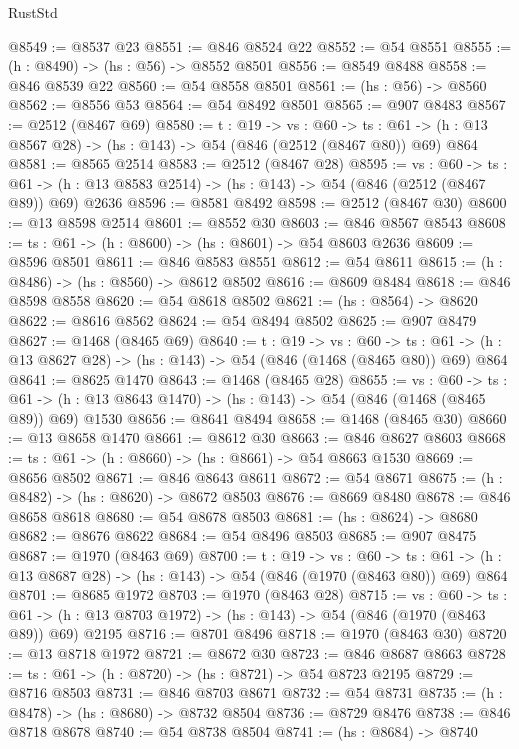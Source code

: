 \begin{lexlean}{RustStd}
\begin{coremodule}
@8549 := @8537 @23
@8551 := @846 @8524 @22
@8552 := @54 @8551
@8555 := (h : @8490) -> (hs : @56) -> @8552 @8501
@8556 := @8549 @8488
@8558 := @846 @8539 @22
@8560 := @54 @8558 @8501
@8561 := (hs : @56) -> @8560
@8562 := @8556 @53
@8564 := @54 @8492 @8501
@8565 := @907 @8483
@8567 := @2512 (@8467 @69)
@8580 := {t : @19} ->
  {vs : @60} ->
  {ts : @61} -> (h : @13 @8567 @28) -> (hs : @143) -> @54 (@846 (@2512 (@8467 @80)) @69) @864
@8581 := @8565 @2514
@8583 := @2512 (@8467 @28)
@8595 := {vs : @60} ->
  {ts : @61} -> (h : @13 @8583 @2514) -> (hs : @143) -> @54 (@846 (@2512 (@8467 @89)) @69) @2636
@8596 := @8581 @8492
@8598 := @2512 (@8467 @30)
@8600 := @13 @8598 @2514
@8601 := @8552 @30
@8603 := @846 @8567 @8543
@8608 := {ts : @61} -> (h : @8600) -> (hs : @8601) -> @54 @8603 @2636
@8609 := @8596 @8501
@8611 := @846 @8583 @8551
@8612 := @54 @8611
@8615 := (h : @8486) -> (hs : @8560) -> @8612 @8502
@8616 := @8609 @8484
@8618 := @846 @8598 @8558
@8620 := @54 @8618 @8502
@8621 := (hs : @8564) -> @8620
@8622 := @8616 @8562
@8624 := @54 @8494 @8502
@8625 := @907 @8479
@8627 := @1468 (@8465 @69)
@8640 := {t : @19} ->
  {vs : @60} ->
  {ts : @61} -> (h : @13 @8627 @28) -> (hs : @143) -> @54 (@846 (@1468 (@8465 @80)) @69) @864
@8641 := @8625 @1470
@8643 := @1468 (@8465 @28)
@8655 := {vs : @60} ->
  {ts : @61} -> (h : @13 @8643 @1470) -> (hs : @143) -> @54 (@846 (@1468 (@8465 @89)) @69) @1530
@8656 := @8641 @8494
@8658 := @1468 (@8465 @30)
@8660 := @13 @8658 @1470
@8661 := @8612 @30
@8663 := @846 @8627 @8603
@8668 := {ts : @61} -> (h : @8660) -> (hs : @8661) -> @54 @8663 @1530
@8669 := @8656 @8502
@8671 := @846 @8643 @8611
@8672 := @54 @8671
@8675 := (h : @8482) -> (hs : @8620) -> @8672 @8503
@8676 := @8669 @8480
@8678 := @846 @8658 @8618
@8680 := @54 @8678 @8503
@8681 := (hs : @8624) -> @8680
@8682 := @8676 @8622
@8684 := @54 @8496 @8503
@8685 := @907 @8475
@8687 := @1970 (@8463 @69)
@8700 := {t : @19} ->
  {vs : @60} ->
  {ts : @61} -> (h : @13 @8687 @28) -> (hs : @143) -> @54 (@846 (@1970 (@8463 @80)) @69) @864
@8701 := @8685 @1972
@8703 := @1970 (@8463 @28)
@8715 := {vs : @60} ->
  {ts : @61} -> (h : @13 @8703 @1972) -> (hs : @143) -> @54 (@846 (@1970 (@8463 @89)) @69) @2195
@8716 := @8701 @8496
@8718 := @1970 (@8463 @30)
@8720 := @13 @8718 @1972
@8721 := @8672 @30
@8723 := @846 @8687 @8663
@8728 := {ts : @61} -> (h : @8720) -> (hs : @8721) -> @54 @8723 @2195
@8729 := @8716 @8503
@8731 := @846 @8703 @8671
@8732 := @54 @8731
@8735 := (h : @8478) -> (hs : @8680) -> @8732 @8504
@8736 := @8729 @8476
@8738 := @846 @8718 @8678
@8740 := @54 @8738 @8504
@8741 := (hs : @8684) -> @8740

\end{coremodule}
\end{lexlean}

